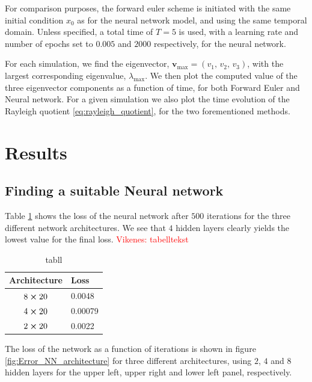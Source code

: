 \documentclass[12pt]{extarticle}
\begin{document}
For comparison purposes, the forward euler scheme is initiated with the same initial condition $x_0$ as for the neural network model, and using the same temporal domain. Unless specified, a total time of $T=5$ is used, with a learning rate and number of epochs set to $0.005$ and $2000$ respectively, for the neural network.

For each simulation, we find the eigenvector, $\mathbf{v}_\mathrm{max}=(v_1,\,v_2,\,v_3)$, with the largest corresponding eigenvalue, $\lambda_\mathrm{max}$. We then plot the computed value of the three eigenvector components as a function of time, for both Forward Euler and Neural network. For a given simulation we also plot the time evolution of the Rayleigh quotient \eqref{eq:rayleigh_quotient}, for the two forementioned methods.   


\section{Results}

\subsection{Finding a suitable Neural network}

Table \ref{tab:NN_architecture_loss} shows the loss of the neural network after $500$ iterations for the three different network architectures. We see that $4$ hidden layers clearly yields the lowest value for the final loss. \textcolor{red}{Vikenes: tabelltekst}
\begin{table}[h]
	\centering
	\begin{tabular}{|c|l|}
		\hline
		Architecture & Loss   \\ \hline
		$8\cross20$         & 0.0048 \\ \hline
		$4\cross20$         & 0.00079 \\ \hline
		$2\cross20$         & 0.0022 \\ \hline
	\end{tabular}
	\caption{tabll}
	\label{tab:NN_architecture_loss}
\end{table}

The loss of the network as a function of iterations is shown in figure \ref{fig:Error_NN_architecture} for three different architectures, using $2$, $4$ and $8$ hidden layers for the upper left, upper right and lower left panel, respectively. 
\end{document}
